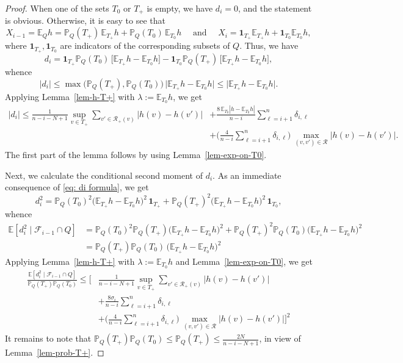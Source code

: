 \documentclass[12pt]{article}
\theoremstyle{definition}
\theoremstyle{plain}
\newcommand{\E}{\mathbb{E}}
\def\Prob{{\mathbb P}}
\def\relation{{\mathcal R}}
\begin{document}
\begin{proof}
When one of the sets $T_0$ or $T_+$ is empty, we have $d_i=0$, and the statement is obvious.
Otherwise, it is easy to see that 
$$
X_{i-1}= \E_Q h=\Prob_Q(T_+)\,\E_{T_+} h   + \Prob_Q(T_0)\,\E_{T_0}h
\quad \text{ and }\quad
X_i= \mathbf{1}_{T_+}\E_{T_+} h  + \mathbf{1}_{T_0}\E_{T_0} h,
$$
where $\mathbf{1}_{T_+},\mathbf{1}_{T_0}$ are indicators of the corresponding subsets of $Q$.
Thus, we have 
\begin{equation}\label{eq: di formula}
d_i= \mathbf{1}_{T_+}\Prob_Q(T_0)\, \big[\E_{T_+} h-\E_{T_0} h\big]
-\mathbf{1}_{T_0}\Prob_Q(T_+)\, \big[\E_{T_+} h-\E_{T_0} h\big],
\end{equation}
whence
$$
\vert d_i\vert
\leq\max\big(\Prob_Q(T_+), \Prob_Q(T_0)\big)\, \vert  \E_{T_+} h-\E_{T_0} h\vert \leq 
 \vert  \E_{T_+} h-\E_{T_0} h\vert.
$$
Applying Lemma~\ref{lem-h-T+} with $\lambda:=\E_{T_0}h$, we get
\begin{align*}
\vert d_i\vert
\leq\frac{1}{n-i-N+1}\sup\limits_{v\in T_+}\sum\limits_{v'\in \relation_+(v)}\big|h(v)-h(v')\big|
&+\frac{8\,\E_{T_0}|h-\E_{T_0}h|}{n-i} \sum_{\ell=i+1}^n \delta_{i,\ell}\\
&+\Big(\frac{4}{n-i} \sum_{\ell=i+1}^n \delta_{i,\ell}\Big)\, \max_{(v,v')\in \relation} \big\vert h(v)-h(v')\big\vert.
\end{align*}
The first part of the lemma follows by using Lemma~\ref{lem-exp-on-T0}.

Next, we calculate the conditional second moment of $d_i$. As an immediate consequence of \eqref{eq: di formula}, we get
$$
d_i^2=\Prob_Q(T_0)^2\big(\E_{T_+} h-\E_{T_0} h\big)^2 \,  \mathbf{1}_{T_+} 
+\Prob_Q(T_+)^2\big(\E_{T_+} h-\E_{T_0} h\big)^2 \,  \mathbf{1}_{T_0},
$$
whence
\begin{align*}
\E [d_i^2\mid\mathcal{F}_{i-1}\cap Q]&= \Prob_Q(T_0)^2\Prob_Q(T_+)\big(\E_{T_+} h-\E_{T_0} h\big)^2 
+\Prob_Q(T_+)^2\Prob_Q(T_0)\big(\E_{T_+} h-\E_{T_0} h\big)^2 \\
&= \Prob_Q(T_+)\Prob_Q(T_0) \, \big(\E_{T_+} h-\E_{T_0} h\big)^2 
\end{align*}
Applying Lemma~\ref{lem-h-T+} with $\lambda:=\E_{T_0}h$ and Lemma~\ref{lem-exp-on-T0}, we get
\begin{align*}
\frac{\E [d_i^2\mid\mathcal{F}_{i-1}\cap Q]}{\Prob_Q(T_+)\Prob_Q(T_0)}\leq 
\Big[&\frac{1}{n-i-N+1}\sup\limits_{v\in T_+}\sum\limits_{v'\in \relation_+(v)}\big|h(v)-h(v')\big|\\
&+\frac{8\sigma_i}{n-i} \sum_{\ell=i+1}^n \delta_{i,\ell}\\
&+\Big(\frac{4}{n-i} \sum_{\ell=i+1}^n \delta_{i,\ell}\Big)\, \max_{(v,v')\in \relation} \big\vert h(v)-h(v')\big\vert\Big]^2
\end{align*}
It remains to note that $\Prob_Q(T_+)\Prob_Q(T_0)\leq \Prob_Q(T_+)\leq \frac{2N}{n-i-N+1}$,
in view of Lemma~\ref{lem-prob-T+}.
\end{proof}
\end{document}

